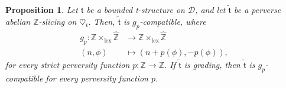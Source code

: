 \documentclass{article}
\newtheorem{prop}[thm]{Proposition}
\theoremstyle{definition}
\newcommand{\Z}{\mathbb{Z}}
\newcommand{\tee}{\mathfrak{t}}
\begin{document}
\begin{prop}\label{grad}
Let $\mathfrak{t}$ be a bounded t-structure on $\mathscr{D}$, and let $\tilde{\tee}$ be a perverse abelian $\mathbb{Z}$-slicing on $\heartsuit_{\mathfrak{t}}$. Then, $\tilde{\tee}$ is $g_p$-compatible, where 
\begin{align*}
g_p\colon \mathbb{Z} \times_{\mathrm{lex}} \hat{\mathbb{Z}}&\to \mathbb{Z} \times_{\mathrm{lex}} \hat{\mathbb{Z}}\\
(n,\phi)&\mapsto(n+p(\phi),-p(\phi)),
\end{align*}
for every  strict perversity function $p\colon \Z\to \Z$. If $\tilde{\tee}$ is grading, then $\tilde{\tee}$ is $g_p$-compatible for every  perversity function $p$.
\end{prop}
\end{document}
